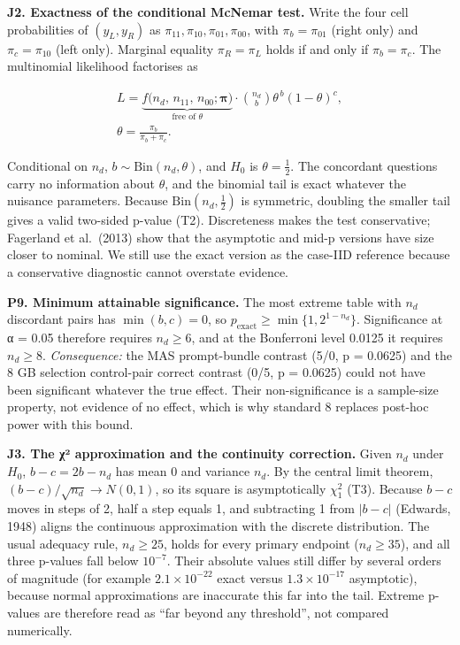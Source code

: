 \documentclass[letterpaper]{article}
\begin{document}
\textbf{J2. Exactness of the conditional McNemar test.} Write the four cell probabilities of \((y_L,y_R)\) as \(\pi_{11},\pi_{10},\pi_{01},\pi_{00}\), with \(\pi_b=\pi_{01}\) (right only) and \(\pi_c=\pi_{10}\) (left only). Marginal equality \(\pi_R=\pi_L\) holds if and only if \(\pi_b=\pi_c\). The multinomial likelihood factorises as \begin{figure}[tbp]
\[\begin{gathered}L=\underbrace{f\big(n_d,\,n_{11},\,n_{00};\boldsymbol\pi\big)}_{\text{free of }\theta}\cdot\binom{n_d}{b}\theta^{\,b}(1-\theta)^{c},\\ \theta=\frac{\pi_b}{\pi_b+\pi_c}.\end{gathered}\]
\end{figure} Conditional on \(n_d\), \(b\sim\mathrm{Bin}(n_d,\theta)\), and \(H_0\) is \(\theta=\tfrac12\). The concordant questions carry no information about \(\theta\), and the binomial tail is exact whatever the nuisance parameters. Because \(\mathrm{Bin}(n_d,\tfrac12)\) is symmetric, doubling the smaller tail gives a valid two-sided p-value (T2). Discreteness makes the test conservative; Fagerland et al.~(2013) show that the asymptotic and mid-p versions have size closer to nominal. We still use the exact version as the case-IID reference because a conservative diagnostic cannot overstate evidence.

\textbf{P9. Minimum attainable significance.} The most extreme table with \(n_d\) discordant pairs has \(\min(b,c)=0\), so \(p_{\text{exact}}\ge\min\{1,2^{1-n_d}\}\). Significance at α = 0.05 therefore requires \(n_d\ge6\), and at the Bonferroni level 0.0125 it requires \(n_d\ge8\). \emph{Consequence:} the MAS prompt-bundle contrast (5/0, p = 0.0625) and the 8 GB selection control-pair correct contrast (0/5, p = 0.0625) could not have been significant whatever the true effect. Their non-significance is a sample-size property, not evidence of no effect, which is why standard 8 replaces post-hoc power with this bound.

\textbf{J3. The χ² approximation and the continuity correction.} Given \(n_d\) under \(H_0\), \(b-c=2b-n_d\) has mean 0 and variance \(n_d\). By the central limit theorem, \((b-c)/\sqrt{n_d}\to N(0,1)\), so its square is asymptotically \(\chi^2_1\) (T3). Because \(b-c\) moves in steps of 2, half a step equals 1, and subtracting 1 from \(\lvert b-c\rvert\) (Edwards, 1948) aligns the continuous approximation with the discrete distribution. The usual adequacy rule, \(n_d\ge25\), holds for every primary endpoint (\(n_d\ge35\)), and all three p-values fall below \(10^{-7}\). Their absolute values still differ by several orders of magnitude (for example \(2.1\times10^{-22}\) exact versus \(1.3\times10^{-17}\) asymptotic), because normal approximations are inaccurate this far into the tail. Extreme p-values are therefore read as ``far beyond any threshold'', not compared numerically.
\end{document}
